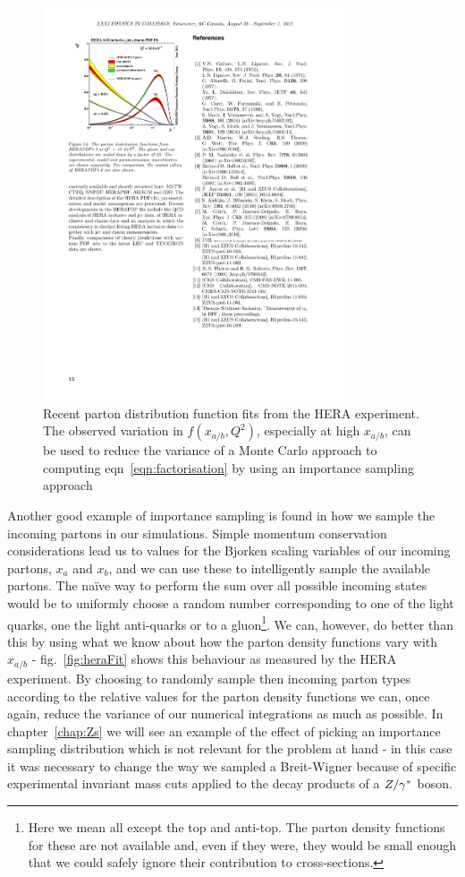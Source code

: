 	\begin{figure}[hbt]
		\centering
		\includegraphics[width=0.8\textwidth, height=0.6\textwidth]{HERAFit}
		\caption{Recent parton distribution function fits from the HERA experiment.  The observed variation in $f(x_{a/b}, Q^2)$, especially at high
		         $x_{a/b}$, can be used to reduce the variance of a Monte Carlo approach to computing eqn~\eqref{eqn:factorisation} by using an
		         importance sampling approach}
		\label{fig:heraFit}
  	\end{figure}

  	Another good example of importance sampling is found in how we sample the incoming partons in our simulations.  Simple momentum
  	conservation considerations lead us to values for the Bjorken scaling variables of our incoming partons, $x_a$ and $x_b$, and we
  	can use these to intelligently sample the available partons.  The na\"ive way to perform the sum over all possible incoming states
  	would be to uniformly choose a random number corresponding to one of the light quarks, one the light anti-quarks or to a
  	gluon\footnote{Here we mean all except the top and anti-top.  The parton density functions for these are not available
  	and, even if they were, they would be small enough that we could safely ignore their contribution to cross-sections.}.  We can,
  	however, do better than this by using what we know about how the parton density functions vary with $x_{a/b}$ - fig.~\eqref{fig:heraFit}
  	shows this behaviour as measured by the HERA experiment.  By choosing to randomly sample then incoming parton types according to the
  	relative values for the parton density functions we can, once again, reduce the variance of our numerical integrations as much as possible.
	In chapter~\ref{chap:Zs} we will see an example of the effect of picking an importance sampling distribution which is not relevant
  	for the problem at hand - in this case it was necessary to change the way we sampled a Breit-Wigner because of specific experimental
  	invariant mass cuts applied to the decay products of a $Z/\gamma^*$ boson.

